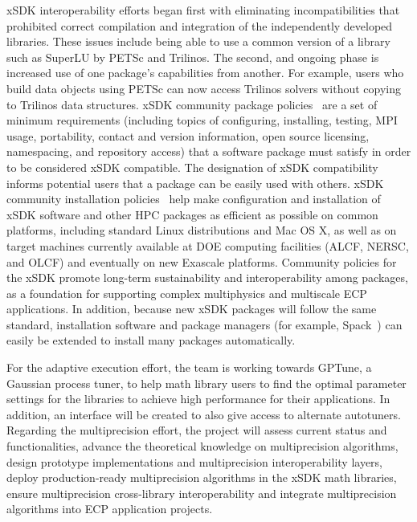xSDK interoperability efforts began first with eliminating incompatibilities that prohibited correct compilation and integration of the independently developed libraries.  These issues include being able to use a common version of a library such as SuperLU by PETSc and Trilinos.  The second, and ongoing phase is increased use of one package's capabilities from another.  For example, users who build data objects using PETSc can now access Trilinos solvers without copying to Trilinos data structures. xSDK community package policies~\cite{xsdk-policies:homepage,xSDK-community-package-policies2019} are a set of minimum requirements (including topics of configuring, installing, testing, MPI usage, portability, contact and version information, open source licensing, namespacing, and repository access) that a software package must satisfy in order to be considered xSDK compatible. The designation of xSDK compatibility informs potential users that a package can be easily used with others. 
xSDK community installation policies~\cite{xSDK-community-installation-policies2019} help make configuration and installation of xSDK software and other HPC packages as efficient as possible on common platforms, including standard Linux distributions and Mac OS X, as well as on target machines currently available at DOE computing facilities (ALCF, NERSC, and OLCF) and eventually on new Exascale platforms.
Community policies for the xSDK promote long-term sustainability and interoperability among packages, as a foundation for supporting complex multiphysics and multiscale ECP applications. In addition, because new xSDK packages will follow the same standard, installation software and package managers (for example, Spack~\cite{gamblin+:sc15}) can easily be extended to install many packages automatically.

For the adaptive execution effort, the team is working towards GPTune, a Gaussian process tuner, to help math library users to find the optimal parameter settings for the libraries to achieve high performance for their applications. In addition, an interface will be created to also give access to alternate autotuners.
Regarding the multiprecision effort, the project will assess current status and functionalities, advance the theoretical knowledge on multiprecision algorithms, design prototype implementations and multiprecision interoperability layers, deploy production-ready multiprecision algorithms in the xSDK math libraries, ensure multiprecision cross-library interoperability and integrate multiprecision algorithms into ECP application projects.

